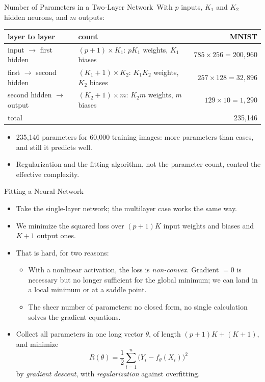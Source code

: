 \documentclass[aspectratio=169,11pt,xcolor=dvipsnames]{beamer}
\newcommand{\adv}{\,\raisebox{0.6pt}{\textcolor{accent}{$\bigstar$}}}
\begin{document}
\begin{frame}{Number of Parameters in a Two-Layer Network\adv}
With $p$ inputs, $K_1$ and $K_2$ hidden neurons, and $m$ outputs:
\begin{center}\small
\renewcommand{\arraystretch}{1.15}
\begin{tabular}{@{}llr@{}}
\toprule
layer to layer & count & MNIST \\
\midrule
input $\to$ first hidden & $(p+1)\times K_1$: $p K_1$ weights, $K_1$ biases & $785\times 256 = 200{,}960$ \\
first $\to$ second hidden & $(K_1+1)\times K_2$: $K_1K_2$ weights, $K_2$ biases & $257\times 128 = 32{,}896$ \\
second hidden $\to$ output & $(K_2+1)\times m$: $K_2 m$ weights, $m$ biases & $129\times 10 = 1{,}290$ \\
\midrule
total & & 235,146 \\
\bottomrule
\end{tabular}
\end{center}
\vskip3pt
\begin{itemize}\itemsep2pt
  \item 235,146 parameters for 60,000 training images: more parameters than cases,
        and still it predicts well.
  \item Regularization and the fitting algorithm, not the parameter count, control
        the effective complexity.
\end{itemize}
\end{frame}

\begin{frame}{Fitting a Neural Network}
\begin{itemize}\itemsep4pt
  \item Take the single-layer network; the multilayer case works the same way.
  \item We minimize the squared loss over $(p+1)K$ input weights and biases and $K+1$
        output ones.
  \item That is hard, for two reasons:
  \begin{itemize}\itemsep2pt
    \item With a nonlinear activation, the loss is \textit{non-convex}. Gradient
          $= 0$ is necessary but no longer sufficient for the global minimum; we can
          land in a local minimum or at a saddle point.
    \item The sheer number of parameters: no closed form, no single calculation
          solves the gradient equations.
  \end{itemize}
  \item Collect all parameters in one long vector $\theta$, of length $(p+1)K + (K+1)$,
        and minimize
  \[
    R(\theta) = \frac12\sum_{i=1}^n\big(Y_i - f_\theta(X_i)\big)^2
  \]
        by \textit{gradient descent}, with \textit{regularization} against overfitting.
\end{itemize}
\end{frame}
\end{document}
